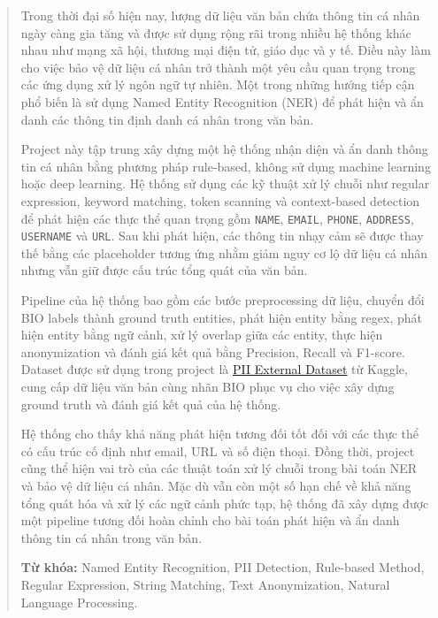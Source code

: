 \begin{abstract}
{}
Trong thời đại số hiện nay, lượng dữ liệu văn bản chứa thông tin cá nhân ngày càng gia tăng và được sử dụng rộng rãi trong nhiều hệ thống khác nhau như mạng xã hội, thương mại điện tử, giáo dục và y tế. Điều này làm cho việc bảo vệ dữ liệu cá nhân trở thành một yêu cầu quan trọng trong các ứng dụng xử lý ngôn ngữ tự nhiên. Một trong những hướng tiếp cận phổ biến là sử dụng Named Entity Recognition (NER) để phát hiện và ẩn danh các thông tin định danh cá nhân trong văn bản.

Project này tập trung xây dựng một hệ thống nhận diện và ẩn danh thông tin cá nhân bằng phương pháp rule-based, không sử dụng machine learning hoặc deep learning. Hệ thống sử dụng các kỹ thuật xử lý chuỗi như regular expression, keyword matching, token scanning và context-based detection để phát hiện các thực thể quan trọng gồm \texttt{NAME}, \texttt{EMAIL}, \texttt{PHONE}, \texttt{ADDRESS}, \texttt{USERNAME} và \texttt{URL}. Sau khi phát hiện, các thông tin nhạy cảm sẽ được thay thế bằng các placeholder tương ứng nhằm giảm nguy cơ lộ dữ liệu cá nhân nhưng vẫn giữ được cấu trúc tổng quát của văn bản.

Pipeline của hệ thống bao gồm các bước preprocessing dữ liệu, chuyển đổi BIO labels thành ground truth entities, phát hiện entity bằng regex, phát hiện entity bằng ngữ cảnh, xử lý overlap giữa các entity, thực hiện anonymization và đánh giá kết quả bằng Precision, Recall và F1-score. Dataset được sử dụng trong project là 
\href{https://www.kaggle.com/datasets/alejopaullier/pii-external-dataset}{PII External Dataset} từ Kaggle,
cung cấp dữ liệu văn bản cùng nhãn BIO phục vụ cho việc xây dựng ground truth và đánh giá kết quả của hệ thống.

Hệ thống cho thấy khả năng phát hiện tương đối tốt đối với các thực thể có cấu trúc cố định như email, URL và số điện thoại. Đồng thời, project cũng thể hiện vai trò của các thuật toán xử lý chuỗi trong bài toán NER và bảo vệ dữ liệu cá nhân. Mặc dù vẫn còn một số hạn chế về khả năng tổng quát hóa và xử lý các ngữ cảnh phức tạp, hệ thống đã xây dựng được một pipeline tương đối hoàn chỉnh cho bài toán phát hiện và ẩn danh thông tin cá nhân trong văn bản.

\textbf{Từ khóa:} Named Entity Recognition, PII Detection, Rule-based Method, Regular Expression, String Matching, Text Anonymization, Natural Language Processing.


\end{abstract}